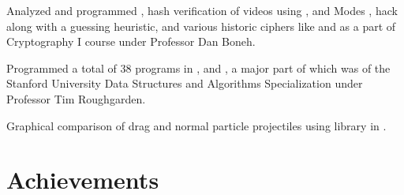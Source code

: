 \documentclass[]{deedy-resume-openfont}
\begin{document}
\vspace{\topsep} %
\begin{large}
\vbox{Analyzed and programmed , hash verification of videos using ,  and  Modes ,  hack along with a guessing heuristic, and various historic ciphers like  and  as a part of Cryptography I course under Professor Dan Boneh.}
\end{large}
\sectionsep

\vspace{\topsep} %
\begin{large}
\vbox{Programmed a total of 38 programs in ,  and , a major part of which was of the Stanford University Data Structures and Algorithms Specialization under Professor Tim Roughgarden.}
\end{large}
\sectionsep

\vspace{\topsep} %
\begin{large}
\vbox{Graphical comparison of drag and normal particle projectiles using  library in .}
\end{large}
\sectionsep

%
%

\section{Achievements}
\end{document}
